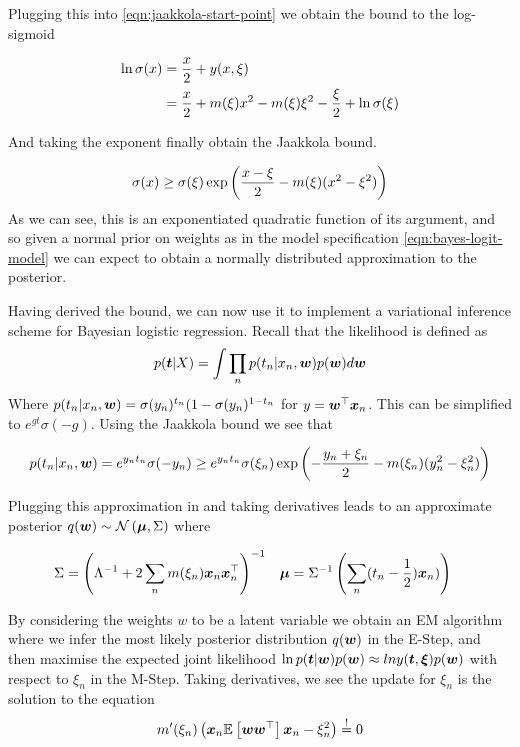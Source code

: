 Plugging this into \eqref{eqn:jaakkola-start-point} we obtain the bound to the log-sigmoid

\begin{align}
\begin{split}
\ln \sigma(x) & = \frac{x}{2} + y(x, \xi) \\
 & = \frac{x}{2} + m(\xi)x^2 - m(\xi)\xi^2 - \frac{\xi}{2} + \ln \sigma(\xi)
\end{split}
\end{align}

And taking the exponent finally obtain the Jaakkola\cite{Jaakkola1997} bound.

\begin{align}
\sigma(x) \geq \sigma(\xi)\exp \left(\frac{x - \xi}{2} - m(\xi)(x^2 - \xi^2) \right)
\end{align}
As we can see, this is an exponentiated quadratic function of its argument, and so given a normal prior on weights as in the model specification \eqref{eqn:bayes-logit-model} we can expect to obtain a normally distributed approximation to the posterior.

Having derived the bound, we can now use it to implement a variational inference scheme for Bayesian logistic regression. Recall that the likelihood is defined as
\begin{align}
p(\bm t|X) = \int \prod_n p(t_n | x_n, \bm w) p(\bm w) d\bm w
\end{align}
Where $p(t_n | x_n, \bm w) = \sigma(y_n)^{t_n}(1- \sigma(y_n)^{1-t_n}$ for $y = \bm w^\top\bm x_n$. This can be simplified to $e^{gt}\sigma(-g)$. Using the Jaakkola bound we see that

\begin{equation}
p(t_n | x_n, \bm w) = e^{y_n t_n}\sigma(-y_n) \geq e^{y_n t_n} \sigma(\xi_n) \exp\left( -\frac{y_n + \xi_n}{2} - m(\xi_n)(y_n^2 - \xi_n^2)\right)
\end{equation}

Plugging this approximation in and taking derivatives leads to an approximate posterior $q(\bm w) \sim \mathcal{N} \left( {\bm \mu}, {\Sigma} \right)$ where

\begin{align}
\Sigma & = {\left( {\Lambda}^{-1} + 2 \sum_n m(\xi_n)\bm x_n\bm x_n^\top \right)}^{-1} & \bm \mu & = {\Sigma}^{-1} \left(\sum_n (t_n - \frac{1}{2}) \bm x_n)\right)
\end{align}

By considering the weights $w$ to be a latent variable we obtain an EM algorithm where we infer the most likely posterior distribution $q(\bm w)$ in the E-Step, and then maximise the expected joint likelihood $\ln p(\bm t| \bm w)p(\bm w) \approx ln y(\bm t, \bm \xi)p(\bm w)$  with respect to $\xi_n$ in the M-Step. Taking derivatives, we see the update for $\xi_n$ is the solution to the equation
\begin{align}
m'(\xi_n) \left( \bm x_n \mathbb{E}_{ {  } }\left[ \bm w\bm w^\top \right]\bm x_n - \xi^2_n \right) \overset{!}{=} 0
\end{align}

